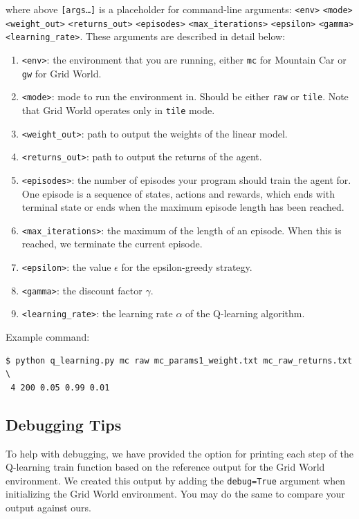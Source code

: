 \documentclass[11pt,addpoints,answers]{exam}
\begin{document}
where above \texttt{[args\dots]} is a placeholder for command-line arguments: \texttt{<env>} \texttt{<mode>} \texttt{<weight\_out>} \texttt{<returns\_out>} \texttt{<episodes>} \texttt{<max\_iterations>} \texttt{<epsilon>} \texttt{<gamma>} \texttt{<learning\_rate>}. These arguments are described in detail below:
\begin{enumerate}
    \item \texttt{<env>}: the environment that you are running, either \texttt{mc} for Mountain Car or \texttt{gw} for Grid World.
    \item \texttt{<mode>}: mode to run the environment in. Should be either \texttt{raw} or \texttt{tile}. Note that Grid World operates only in \texttt{tile} mode.
    \item \texttt{<weight\_out>}: path to output the weights of the linear model.
    \item \texttt{<returns\_out>}: path to output the returns of the agent.
    \item \texttt{<episodes>}: the number of episodes your program should train the agent for. One episode is a sequence of states, actions and rewards, which ends with terminal state or ends when the maximum episode length has been reached.
    \item \texttt{<max\_iterations>}: the maximum of the length of an episode. When this is reached, we terminate the current episode.
    \item \texttt{<epsilon>}: the value $\epsilon$ for the epsilon-greedy strategy.
    \item \texttt{<gamma>}: the discount factor $\gamma$.
    \item \texttt{<learning\_rate>}: the learning rate $\alpha$ of the Q-learning algorithm.
\end{enumerate}


Example command:
\begin{lstlisting}[language=Shell]
$ python q_learning.py mc raw mc_params1_weight.txt mc_raw_returns.txt \ 
 4 200 0.05 0.99 0.01
\end{lstlisting}

\subsection{Debugging Tips}\label{subsec:debugging}

To help with debugging, we have provided the option for printing each step of the Q-learning train function based on the reference output for the Grid World environment. We created this output by adding the \texttt{debug=True} argument when initializing the Grid World environment. You may do the same to compare your output against ours.
\end{document}
